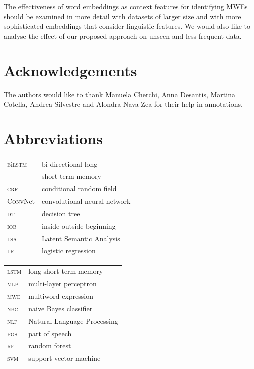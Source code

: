 \documentclass[output=paper
,modfonts
,nonflat]{langsci/langscibook}
\begin{document}
The effectiveness of word embeddings as context features for identifying MWEs should be examined in more detail with datasets of larger size and with more sophisticated embeddings that consider linguistic features. We would also like to analyse the effect of our proposed approach on unseen and less frequent data. 


\section*{Acknowledgements}
The authors would like to thank Manuela Cherchi, Anna Desantis, Martina Cotella, Andrea Silvestre and Alondra Nava Zea for their help in annotations.

\section*{Abbreviations}


\begin{tabularx}{.52\textwidth}{ll}
 \textsc{b}i\textsc{lstm}  & bi-directional long \\ 
 & short-term memory  \\
\textsc{crf}  & conditional random field  \\
\textsc{ConvN}et  & convolutional neural network \\
\textsc{dt}  & decision tree  \\
\textsc{iob}  & inside-outside-beginning  \\
\textsc{lsa}  & Latent Semantic Analysis  \\
\textsc{lr}  & logistic regression  \\
\end{tabularx}
\begin{tabularx}{.48\textwidth}{ll}
\textsc{lstm}  & long short-term memory \\
\textsc{mlp}   & multi-layer perceptron \\
\textsc{mwe} & multiword expression \\
\textsc{nbc}  & naive Bayes classifier  \\
\textsc{nlp} & Natural Language Processing  \\
\textsc{pos} & part of speech  \\
\textsc{rf}  & random forest \\
\textsc{svm}  & support vector machine \\
\end{tabularx}


{\sloppy
\printbibliography[heading=subbibliography,notkeyword=this]
}
\end{document}
